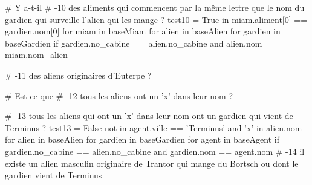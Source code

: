 \documentclass[french]{beamer}
\begin{document}
\begin{frame}[fragile]
\begin{pythoncode}
 
# Y a-t-il 
# -10 des aliments qui commencent par la même lettre que le nom du gardien qui surveille l'alien qui les mange ?
test10 = True in { miam.aliment[0] == gardien.nom[0]
                   for miam in baseMiam
                   for alien in baseAlien
                   for gardien in baseGardien
                   if  gardien.no_cabine  ==  alien.no_cabine and  alien.nom  ==
                   miam.nom_alien }
\end{pythoncode}
\end{frame}

\begin{frame}[fragile]
\begin{pythoncode}
# -11 des aliens originaires d'Euterpe ?
 
# Est-ce que 
# -12 tous les aliens ont un 'x' dans leur nom ?
\end{pythoncode}
\end{frame}

\begin{frame}[fragile]
\begin{pythoncode}
# -13 tous les aliens qui ont un 'x' dans leur nom ont un gardien qui vient de Terminus ?
test13 = False not in { agent.ville == 'Terminus' and 'x' in alien.nom
                        for alien in baseAlien
                        for gardien in baseGardien
                        for agent in baseAgent
                        if gardien.no_cabine == alien.no_cabine and gardien.nom == agent.nom }
# -14 il existe un alien masculin originaire de Trantor qui mange du Bortsch ou dont le gardien vient de Terminus
\end{pythoncode}
\end{frame}
\end{document}
